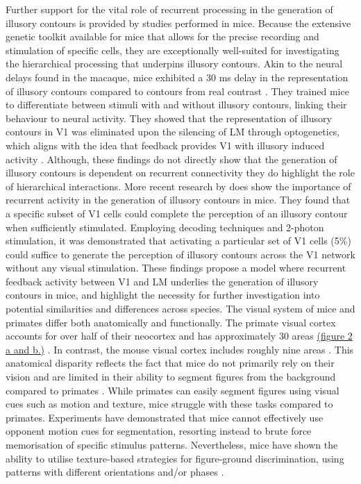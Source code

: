\documentclass[12pt]{article}
\begin{document}
Further support for the vital role of recurrent processing in the generation of illusory contours is provided by studies performed in mice. Because the extensive genetic toolkit available for mice that allows for the precise recording and stimulation of specific cells, they are exceptionally well-suited for investigating the hierarchical processing that underpins illusory contours. Akin to the neural delays found in the macaque, mice exhibited a 30 ms delay in the representation of illusory contours compared to contours from real contrast \autocite{pakTopDownFeedbackControls2020}. They trained mice to differentiate between stimuli with and without illusory contours, linking their behaviour to neural activity. They showed that the representation of illusory contours in V1 was eliminated upon the silencing of LM through optogenetics, which aligns with the idea that feedback provides V1 with illusory induced activity \autocite{wyatteEarlyRecurrentFeedback2014}. Although, these findings do not directly show that the generation of illusory contours is dependent on recurrent connectivity they do highlight the role of hierarchical interactions. More recent research by \textcite{shinRecurrentPatternCompletion2023} does show the importance of recurrent activity in the generation of illusory contours in mice. They found that a specific subset of V1 cells could complete the perception of an illusory contour when sufficiently stimulated. Employing decoding techniques and 2-photon stimulation, it was demonstrated that activating a particular set of V1 cells (5\%) could suffice to generate the perception of illusory contours across the V1 network without any visual stimulation. These findings propose a model where recurrent feedback activity between V1 and LM underlies the generation of illusory contours in mice, and highlight the necessity for further investigation into potential similarities and differences across species.
\bigbreak
The visual system of mice and primates differ both anatomically and functionally. The primate visual cortex accounts for over half of their neocortex and has approximately 30 areas \hyperref[fig:Laminar_Figure]{(figure 2 a and b.)} \autocite{fellemanDistributedHierarchicalProcessing1991}. In contrast, the mouse visual cortex includes roughly nine areas \autocite{wangAreaMapMouse2007}. This anatomical disparity reflects the fact that mice do not primarily rely on their vision and are limited in their ability to segment figures from the background compared to primates \autocite{luongoMicePrimatesUse2023}. While primates can easily segment figures using visual cues such as motion and texture, mice struggle with these tasks compared to primates. Experiments have demonstrated that mice cannot effectively use opponent motion cues for segmentation, resorting instead to brute force memorisation of specific stimulus patterns. Nevertheless, mice have shown the ability to utilise texture-based strategies for figure-ground discrimination, using patterns with different orientations and/or phases \autocite{kirchbergerEssentialRoleFeedback2020}. 
\end{document}

